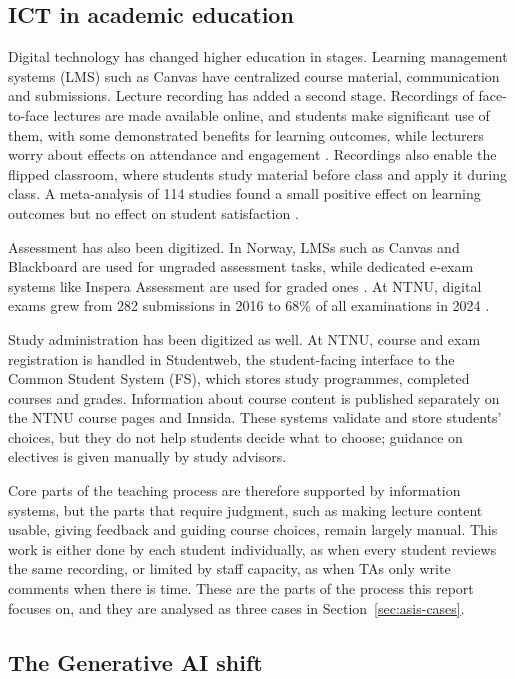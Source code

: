 \subsection{ICT in academic education}\label{sec:ict}

Digital technology has changed higher education in stages. Learning management systems (LMS) such as Canvas have centralized course material, communication and submissions. Lecture recording has added a second stage. Recordings of face-to-face lectures are made available online, and students make significant use of them, with some demonstrated benefits for learning outcomes, while lecturers worry about effects on attendance and engagement \parencite{ocallaghan2017}. Recordings also enable the flipped classroom, where students study material before class and apply it during class. A meta-analysis of 114 studies found a small positive effect on learning outcomes but no effect on student satisfaction \parencite{vanalten2019}.

Assessment has also been digitized. In Norway, LMSs such as Canvas and Blackboard are used for ungraded assessment tasks, while dedicated e-exam systems like Inspera Assessment are used for graded ones \parencite{chirumamilla2021}. At NTNU, digital exams grew from 282 submissions in 2016 to 68\% of all examinations in 2024 \parencite{inspera2025}.

Study administration has been digitized as well. At NTNU, course and exam registration is handled in Studentweb, the student-facing interface to the Common Student System (FS), which stores study programmes, completed courses and grades. Information about course content is published separately on the NTNU course pages and Innsida. These systems validate and store students' choices, but they do not help students decide what to choose; guidance on electives is given manually by study advisors.

Core parts of the teaching process are therefore supported by information systems, but the parts that require judgment, such as making lecture content usable, giving feedback and guiding course choices, remain largely manual. This work is either done by each student individually, as when every student reviews the same recording, or limited by staff capacity, as when TAs only write comments when there is time. These are the parts of the process this report focuses on, and they are analysed as three cases in Section~\ref{sec:asis-cases}.

\subsection{The Generative AI shift}\label{sec:genai}

